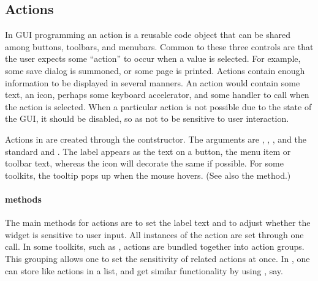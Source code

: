 






\subsection{Actions}
\label{sec:gWidgets-actions}

In GUI programming an action is a reusable code object that can be
shared among buttons, toolbars, and menubars. Common to these three
controls are that the user expects some ``action'' to occur when a
value is selected. For example, some save dialog is summoned, or some
page is printed.
Actions contain enough information to be displayed in several
manners. An action would contain some text, an icon, perhaps some
keyboard accelerator, and some handler to call when the action is
selected. When a particular action is not possible due to the state of
the GUI, it should be disabled, so as not to be sensitive to user interaction.

Actions in  are created through the
 contstructor. The arguments are
, ,
,  and the
standard  and
. The label appears as the text on a button,
the menu item or toolbar text, whereas the icon will decorate the same
if possible. For some toolkits, the tooltip pops up when the mouse hovers.
(See also the  method.)

\paragraph{methods}
The main methods for actions are  to
set the label text and  to adjust
whether the widget is sensitive to user input. All instances of the
action are set through one call. In some toolkits, such as
, actions are bundled together into action groups. This
grouping allows one to set the sensitivity of related actions at
once. In \R, one can store like actions in a list, and get similar
functionality by using , say.

